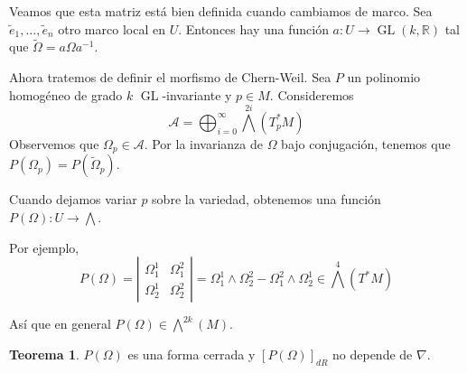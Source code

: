 \documentclass[spanish]{book}
\theoremstyle{definition}
\newtheorem*{teo}{Teorema}
\newcommand{\R}{\mathbb{R}}
\begin{document}
Veamos que esta matriz está bien definida cuando cambiamos de marco. Sea $\tilde{e}_1,\ldots,\tilde{e}_n$ otro marco local en $U$. Entonces hay una función $a:U\to\operatorname{GL}(k,\R)$ tal que $\tilde{\Omega}=a\Omega a^{-1}$.

Ahora tratemos de definir el morfismo de Chern-Weil. Sea $P$ un polinomio homogéneo de grado $k$ $\operatorname{GL}$-invariante y $p\in M$. Consideremos 
\[\mathcal{A}=\bigoplus_{i=0}^\infty \bigwedge^{2i}(T^*_pM)\]
Observemos que $\Omega_p\in \mathcal{A}$. Por la invarianza de $\Omega$ bajo conjugación, tenemos que $P(\Omega_p)=P(\tilde{\Omega}_p)$.
	
Cuando dejamos variar $p$ sobre la variedad, obtenemos una función $P(\Omega):U\to\bigwedge$.

Por ejemplo,
\[P(\Omega)=\left|\begin{matrix}
	\Omega^1_1&\Omega^2_1\\
	\Omega^1_2&\Omega^2_2
\end{matrix}\right|=\Omega^1_1\wedge\Omega^2_2-\Omega^2_1\wedge\Omega^1_2\in\bigwedge^4(T^*M)\]

Así que en general $P(\Omega)\in\bigwedge^{2k}(M)$.
\begin{teo}
	$P(\Omega)$ es una forma cerrada y $[P(\Omega)]_{dR}$ no depende de $\nabla$.
\end{teo}
\end{document}
